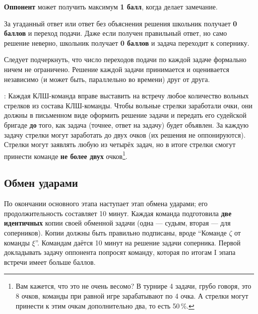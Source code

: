 \documentclass[12pt]{article}
\begin{document}
\textbf{Оппонент} может получить максимум \textbf{1 балл}, когда делает замечание.

За угаданный ответ или ответ без объяснения решения школьник получает \textbf{0 баллов} и переход подачи. 
Даже если получен правильный ответ, но само решение неверно, школьник получает \textbf{0 баллов} и задача переходит к сопернику.

Следует подчеркнуть, что число переходов подачи по каждой задаче формально ничем не ограничено. Решение каждой задачи принимается и оценивается независимо (и может быть, параллельно во времени) друг от друга.

: Каждая КЛШ-команда вправе выставить на встречу любое количество вольных стрелков из состава КЛШ-команды. Чтобы вольные стрелки заработали очки, они должны в письменном виде оформить решение задачи и передать его судейской бригаде {\bf до} того, как задача (точнее, ответ на задачу) будет объявлен. За каждую задачу стрелки могут заработать до двух очков (их решения не оппонируются). Стрелки могут заявлять любую из четырёх задач, но в итоге стрелки смогут принести команде {\bf не более двух} очков\footnote{Вам кажется, что это не очень весомо? В турнире 4 задачи, грубо говоря, это 8 очков, команды при равной игре зарабатывают по 4 очка. А стрелки могут принести к этим очкам дополнительно два, то есть 50\,\%.}.

\subsection*{Обмен ударами}
По окончании основного этапа наступает этап обмена ударами; его продолжительность составляет 10 минут. Каждая команда подготовила {\bf две идентичных} копии своей обменной задачи (одна --- судьям, вторая --- для соперников). Копии должны быть правильно подписаны, вроде ``Команде $\zeta$ от команды $\xi$''. Командам даётся 10 минут на решение задачи соперника. Первой докладывать задачу оппонента попросят команду, которая по итогам I эпапа встречи имеет больше баллов.
\end{document}
